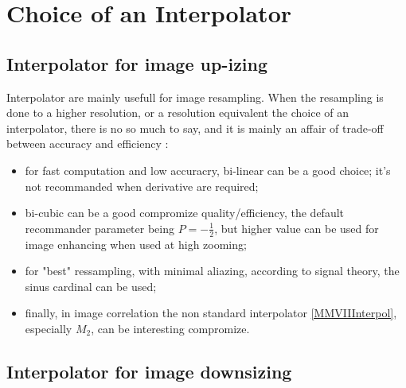 
\section{Choice of an Interpolator}


\subsection{Interpolator for image up-izing}

Interpolator are mainly usefull for image resampling.  When the resampling is done
to a higher resolution, or a resolution equivalent the choice of an interpolator,
there is no so much to say, and it is mainly an affair of trade-off between accuracy and efficiency :

\begin{itemize}
   \item for fast computation and low accuracry, bi-linear can be a good choice;
         it's not recommanded when derivative are required;

   \item bi-cubic can be a good compromize quality/efficiency, the default recommander
         parameter being $P=-\frac{1}{2}$, but higher value can be used for image enhancing
         when used at high zooming;

   \item for "best" ressampling, with minimal aliazing, according to signal theory, the sinus cardinal
         can be used;

   \item finally, in image correlation the non standard interpolator \ref{MMVIIInterpol}, especially $M_2$,
         can be interesting compromize.

\end{itemize}


\subsection{Interpolator for image downsizing}



